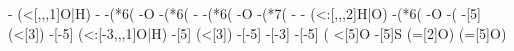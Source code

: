 \begin{struct}
{                                                                    -
                                                                      (<[,,,1]\textcolor{O}{O}|\textcolor{O}{H})
                                                                    -
                                                                    -(*6(
                                                                      -\textcolor{O}{O}
                                                                      -(*6(
                                                                        -
                                                                        -(*6(
                                                                          -\textcolor{O}{O}
                                                                          -(*7(
                                                                            -
                                                                            -
                                                                              (<:[,,,2]\textcolor{O}{H}|\textcolor{O}{O})
                                                                            -(*6(
                                                                              -\textcolor{O}{O}
                                                                              -(
                                                                                -[5]
                                                                                  (<[3])
                                                                                -[-5]
                                                                                  (<:[-3,,,1]\textcolor{O}{O}|\textcolor{O}{H})
                                                                                -[5]
                                                                                  (<[3])
                                                                                -[-5]
                                                                                -[-3]
                                                                                -[-5]
                                                                                  (
                                                                                    <[5]\textcolor{O}{O}
                                                                                    -[5]\textcolor{S}{S}
                                                                                      (=[2]\textcolor{O}{O})
                                                                                      (=[5]\textcolor{O}{O})
}
\end{struct}
